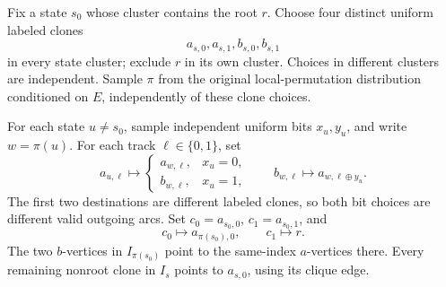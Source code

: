\documentclass[11pt]{article}
\theoremstyle{definition}
\theoremstyle{remark}
\numberwithin{equation}{section}
\begin{document}
Fix a state \(s_0\) whose cluster contains the root \(r\).
Choose four distinct uniform labeled clones
\[
                      a_{s,0},a_{s,1},b_{s,0},b_{s,1}
\]
in every state cluster; exclude \(r\) in its own cluster.
Choices in different clusters are independent. Sample \(\pi\)
from the original local-permutation distribution conditioned on
\(E\), independently of these clone choices.

For each state \(u\ne s_0\), sample independent uniform bits
\(x_u,y_u\), and write \(w=\pi(u)\). For each track
\(\ell\in\{0,1\}\), set
\begin{equation}\label{eq:10}
a_{u,\ell}\longmapsto
 \begin{cases}a_{w,\ell},&x_u=0,\\ b_{w,\ell},&x_u=1,\end{cases}
 \qquad
 b_{w,\ell}\longmapsto a_{w,\ell\oplus y_u}.
\end{equation}
The first two destinations are different labeled clones, so both
bit choices are different valid outgoing arcs.
Set \(c_0=a_{s_0,0}\), \(c_1=a_{s_0,1}\), and
\begin{equation}\label{eq:11}
c_0\longmapsto a_{\pi(s_0),0},
                         \qquad c_1\longmapsto r.
\end{equation}
The two \(b\)-vertices in \(I_{\pi(s_0)}\) point to the same-index
\(a\)-vertices there. Every remaining nonroot clone in \(I_s\)
points to \(a_{s,0}\), using its clique edge.
\end{document}
